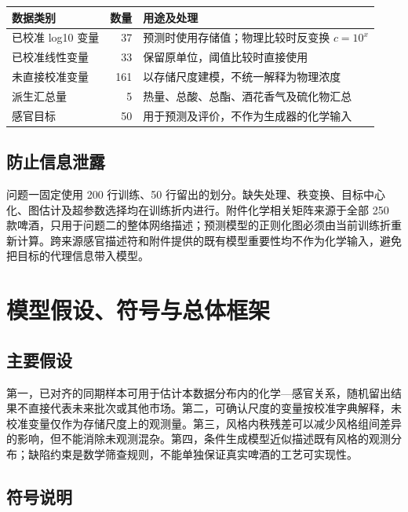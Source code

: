 \documentclass[
  chinese,
  11pt,
]{article}
\newcounter{none} %
\begin{document}
{\def\LTcaptype{none} %
\begin{longtable}[]{@{}lrl@{}}
\toprule\noalign{}
数据类别 & 数量 & 用途及处理 \\
\midrule\noalign{}
\endhead
\bottomrule\noalign{}
\endlastfoot
已校准 log10 变量 & 37 & 预测时使用存储值；物理比较时反变换
\(c=10^x\) \\
已校准线性变量 & 33 & 保留原单位，阈值比较时直接使用 \\
未直接校准变量 & 161 & 以存储尺度建模，不统一解释为物理浓度 \\
派生汇总量 & 5 & 热量、总酸、总酯、酒花香气及硫化物汇总 \\
感官目标 & 50 & 用于预测及评价，不作为生成器的化学输入 \\
\end{longtable}
}

\subsection{防止信息泄露}\label{ux9632ux6b62ux4fe1ux606fux6cc4ux9732}

问题一固定使用 200 行训练、50
行留出的划分。缺失处理、秩变换、目标中心化、图估计及超参数选择均在训练折内进行。附件化学相关矩阵来源于全部
250
款啤酒，只用于问题二的整体网络描述；预测模型的正则化图必须由当前训练折重新计算。跨来源感官描述符和附件提供的既有模型重要性均不作为化学输入，避免把目标的代理信息带入模型。

\section{模型假设、符号与总体框架}\label{ux6a21ux578bux5047ux8bbeux7b26ux53f7ux4e0eux603bux4f53ux6846ux67b6}

\subsection{主要假设}\label{ux4e3bux8981ux5047ux8bbe}

第一，已对齐的同期样本可用于估计本数据分布内的化学---感官关系，随机留出结果不直接代表未来批次或其他市场。第二，可确认尺度的变量按校准字典解释，未校准变量仅作为存储尺度上的观测量。第三，风格内秩残差可以减少风格组间差异的影响，但不能消除未观测混杂。第四，条件生成模型近似描述既有风格的观测分布；缺陷约束是数学筛查规则，不能单独保证真实啤酒的工艺可实现性。

\subsection{符号说明}\label{ux7b26ux53f7ux8bf4ux660e}
\end{document}
